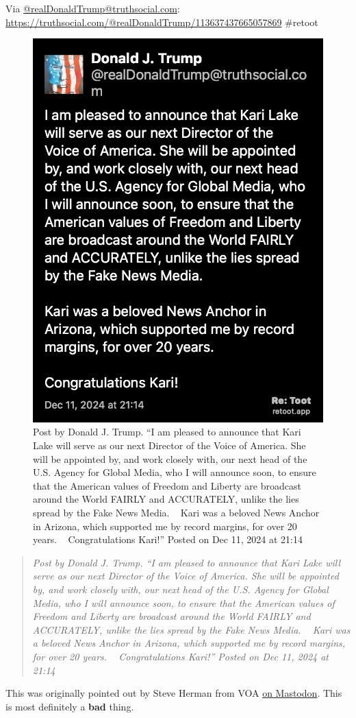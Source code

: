 Via \href{http://www.example.com/}{@realDonaldTrump@truthsocial.com}:
\href{http://www.example.com/}{https://truthsocial.com/@realDonaldTrump/113637437665057869}
\#retoot

\begin{figure}
\centering
\includegraphics[width=\textwidth,keepaspectratio]{karilakevoa.jpg}
\caption{Post by Donald J. Trump. ``I am pleased to announce that Kari
Lake will serve as our next Director of the Voice of America. She will
be appointed by, and work closely with, our next head of the U.S. Agency
for Global Media, who I will announce soon, to ensure that the American
values of Freedom and Liberty are broadcast around the World FAIRLY and
ACCURATELY, unlike the lies spread by the Fake News Media. ~ Kari was a
beloved News Anchor in Arizona, which supported me by record margins,
for over 20 years. ~ Congratulations Kari!'' Posted on Dec 11, 2024 at
21:14}
\end{figure}

\begin{quote}
\emph{Post by Donald J. Trump. ``I am pleased to announce that Kari Lake
will serve as our next Director of the Voice of America. She will be
appointed by, and work closely with, our next head of the U.S. Agency
for Global Media, who I will announce soon, to ensure that the American
values of Freedom and Liberty are broadcast around the World FAIRLY and
ACCURATELY, unlike the lies spread by the Fake News Media. ~ Kari was a
beloved News Anchor in Arizona, which supported me by record margins,
for over 20 years. ~ Congratulations Kari!'' Posted on Dec 11, 2024 at
21:14}
\end{quote}

This was originally pointed out by Steve Herman from VOA
\href{https://journa.host/@w7voa/113637502357559803}{on Mastodon}. This
is most definitely a \textbf{bad} thing.
